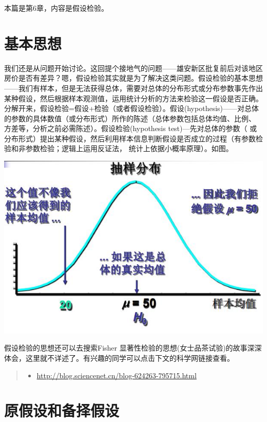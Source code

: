 \documentclass[]{ctexbook}
\providecommand{\tightlist}{%
  \setlength{\itemsep}{0pt}\setlength{\parskip}{0pt}}
\begin{document}
本篇是第6章，内容是假设检验。

\hypertarget{ux57faux672cux601dux60f3}{%
\section{基本思想}\label{ux57faux672cux601dux60f3}}

我们还是从问题开始讨论。这回提个接地气的问题------雄安新区批复前后对该地区房价是否有差异？嗯，假设检验其实就是为了解决这类问题。假设检验的基本思想------我们有样本，但是无法获得总体，需要对总体的分布形式或分布参数事先作出某种假设，然后根据样本观测值，运用统计分析的方法来检验这一假设是否正确。分解开来，假设检验=假设+检验（或者假设检验）。假设(hypothesis)------对总体的参数的具体数值（或分布形式）所作的陈述（总体参数包括总体均值、比例、 方差等，分析之前必需陈述）。假设检验(hypothesis test)---先对总体的参数（ 或分布形式）提出某种假设，然后利用样本信息判断假设是否成立的过程（有参数检验和非参数检验；逻辑上运用反证法， 统计上依据小概率原理）。如图。

\includegraphics[width=1\linewidth,height=0.35\textheight]{fig/fig9}

假设检验的思想还可以去搜索Fisher 显著性检验的思想(女士品茶试验)的故事深深体会，这里就不详述了。有兴趣的同学可以点击下文的科学网链接查看。

\begin{quote}
\begin{itemize}
\tightlist
\item
  \url{http://blog.sciencenet.cn/blog-624263-795715.html}
\end{itemize}
\end{quote}

\hypertarget{ux539fux5047ux8bbeux548cux5907ux62e9ux5047ux8bbe}{%
\section{原假设和备择假设}\label{ux539fux5047ux8bbeux548cux5907ux62e9ux5047ux8bbe}}
\end{document}
